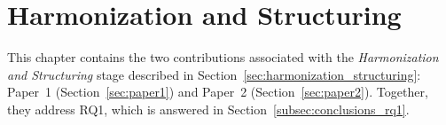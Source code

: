 \chapter{Harmonization and Structuring}
\label{chap:harmonization_structuring}
This chapter contains the two contributions associated with the \emph{Harmonization and Structuring} stage described in Section~\ref{sec:harmonization_structuring}: Paper~1 (Section~\ref{sec:paper1}) and Paper~2 (Section~\ref{sec:paper2}). Together, they address RQ1, which is answered in Section~\ref{subsec:conclusions_rq1}.




